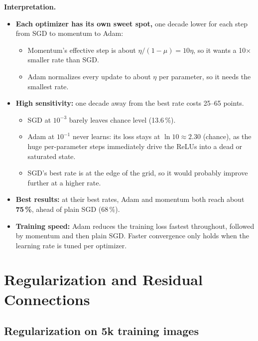 \documentclass[11pt,a4paper]{article}
\begin{document}
\textbf{Interpretation.}
\begin{itemize}
  \item \textbf{Each optimizer has its own sweet spot,} one decade lower for each step from SGD to momentum to Adam:
  \begin{itemize}
    \item Momentum's effective step is about $\eta/(1-\mu)=10\eta$, so it wants a 10$\times$ smaller rate than SGD.
    \item Adam normalizes every update to about $\eta$ per parameter, so it needs the smallest rate.
  \end{itemize}
  \item \textbf{High sensitivity:} one decade away from the best rate costs 25--65 points.
  \begin{itemize}
    \item SGD at $10^{-3}$ barely leaves chance level (13.6\,\%).
    \item Adam at $10^{-1}$ never learns: its loss stays at $\ln10\approx2.30$ (chance), as the huge per-parameter steps immediately drive the ReLUs into a dead or saturated state.
    \item SGD's best rate is at the edge of the grid, so it would probably improve further at a higher rate.
  \end{itemize}
  \item \textbf{Best results:} at their best rates, Adam and momentum both reach about \textbf{75\,\%}, ahead of plain SGD (68\,\%).
  \item \textbf{Training speed:} Adam reduces the training loss fastest throughout, followed by momentum and then plain SGD. Faster convergence only holds when the learning rate is tuned per optimizer.
\end{itemize}

\section{Regularization and Residual Connections}

\subsection{Regularization on 5k training images}
\end{document}
